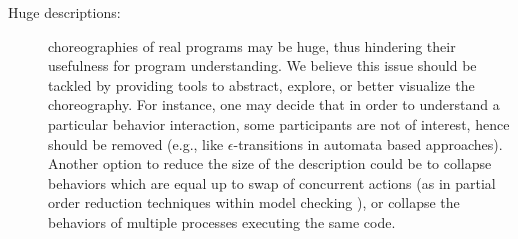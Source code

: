 \begin{description}
  \item[Huge descriptions:] choreographies of real programs may be
    huge, thus hindering their usefulness for program understanding.
    We believe this issue should be tackled by providing tools to
    abstract, explore, or better visualize the choreography. 
    For instance, one
    may decide that in order to understand a particular behavior interaction, some participants are not of interest, hence should be
    removed (e.g., like $\epsilon$-transitions in automata based
    approaches). Another option to reduce the size of the description
    could be to collapse behaviors which are equal up to swap of
    concurrent actions (as in partial order reduction techniques
    within model checking \cite{God97}), or collapse the behaviors
	 of multiple
    processes executing the same code.
\end{description}